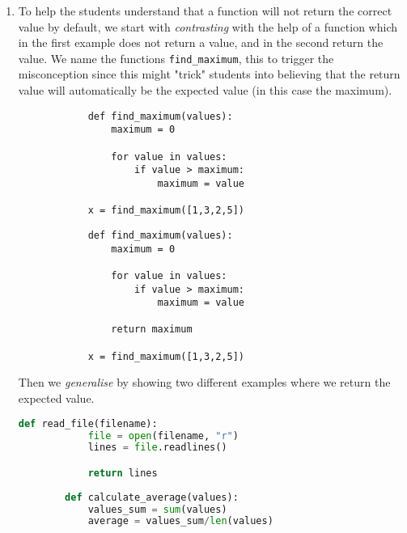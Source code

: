 \begin{enumerate}
    \item To help the students understand that a function will not return 
the correct value by default, we start with \emph{contrasting} with the 
help of a function which in the first example does not return a value, 
and in the second return the value. We name the functions \texttt{find_maximum}, this to trigger the misconception since this 
might "trick" students into believing that the return value will 
automatically be the expected value (in this case the maximum). 

    \hfill
     \begin{minipage}[t]{0.45\columnwidth}
        \begin{verbatim}
            def find_maximum(values):
                maximum = 0
    
                for value in values:
                    if value > maximum:
                        maximum = value 
            
            x = find_maximum([1,3,2,5])
        \end{verbatim}
    \end{minipage}
\hfill
    \begin{minipage}[t]{0.45\columnwidth}
        \begin{verbatim}
            def find_maximum(values):
                maximum = 0
    
                for value in values:
                    if value > maximum:
                        maximum = value
                        
                return maximum
            
            x = find_maximum([1,3,2,5])
        \end{verbatim}
    \end{minipage}
\hfill

    Then we \emph{generalise} by showing two different examples where we 
return the expected value. 

    \begin{lstlisting}[language=Python]
        def read_file(filename):
            file = open(filename, "r")
            lines = file.readlines()

            return lines
            
        def calculate_average(values):
            values_sum = sum(values)
            average = values_sum/len(values)
     

\end{lstlisting}
\end{enumerate}
